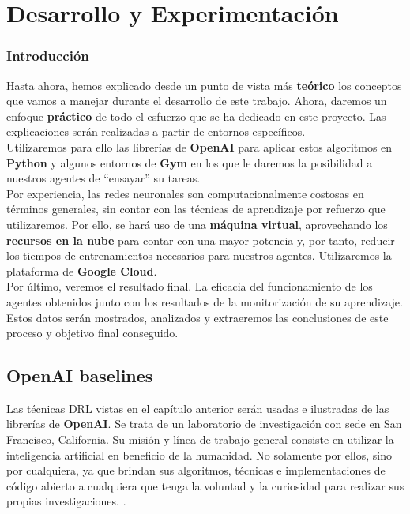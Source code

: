 \documentclass[11pt,fleqn]{book} %
\begin{document}

\part{Desarrollo y Experimentación}

\section*{Introducción}\label{sec:introduccionexp}

Hasta ahora, hemos explicado desde un punto de vista más \textbf{teórico} los conceptos que vamos a manejar durante el desarrollo de este trabajo. Ahora, daremos un enfoque \textbf{práctico} de todo el esfuerzo que se ha dedicado en este proyecto. Las explicaciones serán realizadas a partir de entornos específicos. \\

Utilizaremos para ello las librerías de \textbf{OpenAI} para aplicar estos algoritmos en \textbf{Python} y algunos entornos de \textbf{Gym} en los que le daremos la posibilidad a nuestros agentes de ``ensayar'' su tareas. \\

Por experiencia, las redes neuronales son computacionalmente costosas en términos generales, sin contar con las técnicas de aprendizaje por refuerzo que utilizaremos. Por ello, se hará uso de una \textbf{máquina virtual}, aprovechando los \textbf{recursos en la nube} para contar con una mayor potencia y, por tanto, reducir los tiempos de entrenamientos necesarios para nuestros agentes. Utilizaremos la plataforma de \textbf{Google Cloud}. \\

Por último, veremos el resultado final. La eficacia del funcionamiento de los agentes obtenidos junto con los resultados de la monitorización de su aprendizaje. Estos datos serán mostrados, analizados y extraeremos las conclusiones de este proceso y objetivo final conseguido.

\chapter{OpenAI baselines}\label{sec:DRL}

Las técnicas DRL vistas en el capítulo anterior serán usadas e ilustradas de las librerías de \textbf{OpenAI}. Se trata de un laboratorio de investigación con sede en San Francisco, California. Su misión y línea de trabajo general consiste en utilizar la inteligencia artificial en beneficio de la humanidad. No solamente por ellos, sino por cualquiera, ya que brindan sus algoritmos, técnicas e implementaciones de código abierto a cualquiera que tenga la voluntad y la curiosidad para realizar sus propias investigaciones. \cite{article:openAI}. \\
\end{document}
